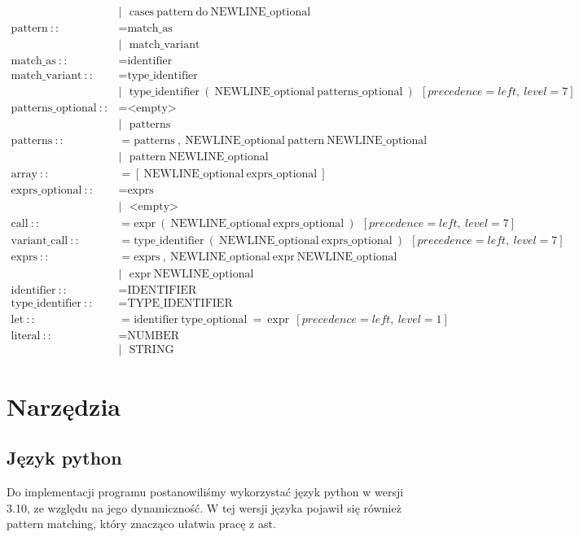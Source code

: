 \documentclass{article}
\begin{document}
\begin{align*}
    &|\ \ \ \text{cases}\ \text{pattern}\ \text{do}\ \text{NEWLINE\_optional}\\
  \text{pattern}\ ::&= \text{match\_as}\\
    &|\ \ \ \text{match\_variant}\\
  \text{match\_as}\ ::&= \text{identifier}\\
  \text{match\_variant}\ ::&= \text{type\_identifier}\\
    &|\ \ \ \text{type\_identifier}\ (\ \text{NEWLINE\_optional}\ \text{patterns\_optional}\ )\ \ [precedence=left,\ level=7]\\
  \text{patterns\_optional}\ ::&= \text{<empty>}\\
    &|\ \ \ \text{patterns}\\
  \text{patterns}\ ::&= \text{patterns}\ ,\ \text{NEWLINE\_optional}\ \text{pattern}\ \text{NEWLINE\_optional}\\
    &|\ \ \ \text{pattern}\ \text{NEWLINE\_optional}\\
  \text{array}\ ::&= [\ \text{NEWLINE\_optional}\ \text{exprs\_optional}\ ]\\
  \text{exprs\_optional}\ ::&= \text{exprs}\\
    &|\ \ \ \text{<empty>}\\
  \text{call}\ ::&= \text{expr}\ (\ \text{NEWLINE\_optional}\ \text{exprs\_optional}\ )\ \ [precedence=left,\ level=7]\\
  \text{variant\_call}\ ::&= \text{type\_identifier}\ (\ \text{NEWLINE\_optional}\ \text{exprs\_optional}\ )\ \ [precedence=left,\ level=7]\\
  \text{exprs}\ ::&= \text{exprs}\ ,\ \text{NEWLINE\_optional}\ \text{expr}\ \text{NEWLINE\_optional}\\
    &|\ \ \ \text{expr}\ \text{NEWLINE\_optional}\\
  \text{identifier}\ ::&= \text{IDENTIFIER}\\
  \text{type\_identifier}\ ::&= \text{TYPE\_IDENTIFIER}\\
  \text{let}\ ::&= \text{identifier}\ \text{type\_optional}\ =\ \text{expr}\ \ [precedence=left,\ level=1]\\
  \text{literal}\ ::&= \text{NUMBER}\\
    &|\ \ \ \text{STRING}
  \end{align*}
\section{Narzędzia}
\subsection{Język python}
Do implementacji programu postanowiliśmy wykorzystać język python w wersji 3.10, ze względu na jego dynamiczność.
W tej wersji języka pojawił się również pattern matching, który znacząco ułatwia pracę z ast.
\end{document}
